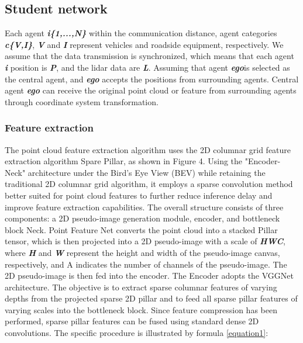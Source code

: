 \documentclass[lettersize,journal]{IEEEtran}
\begin{document}
\subsection{Student network}

Each agent \textbf{\textit{i\{1,...,N\}}} within the communication distance, agent categories \textbf{\textit{c\{V,I\}}}, \textbf{\textit{V}} and \textbf{\textit{I}} represent vehicles and roadside equipment, respectively. We assume that the data transmission is synchronized, which means that each agent \textbf{\textit{i}} position is \textbf{\textit{P}}, and the lidar data are \textbf{\textit{L}}. Assuming that agent \textbf{\textit{ego}}is selected as the central agent, and \textbf{\textit{ego}} accepts the positions from surrounding agents. Central agent \textbf{\textit{ego}} can receive the original point cloud or feature from surrounding agents through coordinate system transformation.

\subsubsection{Feature extraction}

The point cloud feature extraction algorithm uses the 2D columnar grid feature extraction algorithm Spare Pillar, as shown in Figure 4. Using the "Encoder-Neck" architecture under the Bird's Eye View (BEV) while retaining the traditional 2D columnar grid algorithm, it employs a sparse convolution method better suited for point cloud features to further reduce inference delay and improve feature extraction capabilities. The overall structure consists of three components: a 2D pseudo-image generation module, encoder, and bottleneck block Neck. Point Feature Net converts the point cloud into a stacked Pillar tensor, which is then projected into a 2D pseudo-image with a scale of \textbf{\textit{HWC}}, where \textbf{\textit{H}} and \textbf{\textit{W}} represent the height and width of the pseudo-image canvas, respectively, and A indicates the number of channels of the pseudo-image. The 2D pseudo-image is then fed into the encoder. The Encoder adopts the VGGNet \cite{34} architecture. The objective is to extract sparse columnar features of varying depths from the projected sparse 2D pillar and to feed all sparse pillar features of varying scales into the bottleneck block. Since feature compression has been performed, sparse pillar features can be fused using standard dense 2D convolutions. The specific procedure is illustrated by formula \eqref{equation1}:
\end{document}
